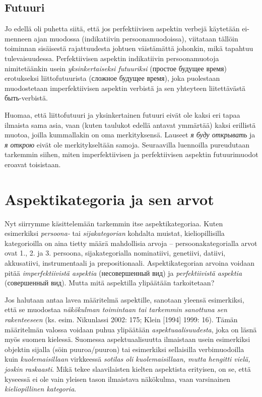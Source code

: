 \documentclass[]{scrreprt}
\begin{document}
\subsection{Futuuri}\label{futuuri}

Jo edellä oli puhetta siitä, että jos perfektiivisen aspektin verbejä
käytetään ei-menneen ajan muodossa (indikatiivin persoonamuodoissa),
viitataan tällöin toiminnan sisäisestä rajattuudesta johtuen väistämättä
johonkin, mikä tapahtuu tulevaisuudessa. Perfektiivisen aspektin
indikatiivin persoonamuotoja nimitetäänkin usein \emph{yksinkertaiseksi
futuuriksi} (простое будущее время) erotukseksi liittofutuurista
(сложное будущее время), joka puolestaan muodostetaan imperfektiivisen
aspektin verbistä ja sen yhteyteen liitettävästä быть-verbistä.

Huomaa, että liittofutuuri ja yksinkertainen futuuri eivät ole kaksi eri
tapaa ilmaista sama asia, vaan (kuten taulukot edellä antavat ymmärtää)
kaksi erillistä muotoa, joilla kummallakin on oma merkityksensä. Lauseet
\emph{я буду открывать} ja \emph{я открою} eivät ole merkitykseltään
samoja. Seuraavilla luennoilla pureudutaan tarkemmin siihen, miten
imperfektiivisen ja perfektiivisen aspektin futuurimuodot eroavat
toisistaan.

\section{Aspektikategoria ja sen
arvot}\label{aspektikategoria-ja-sen-arvot}

Nyt siirrymme käsittelemään tarkemmin itse aspektikategoriaa. Kuten
esimerkiksi \emph{persoona-} tai \emph{sijakategorian} kohdalta muistat,
kieliopillisilla kategorioilla on aina tietty määrä mahdollisia arvoja
-- persoonakategorialla arvot ovat 1., 2. ja 3. persoona,
sijakategorialla nominatiivi, genetiivi, datiivi, akkusatiivi,
instrumentaali ja prepositionaali. Aspektikategorian arvoina voidaan
pitää \emph{imperfektiivistä aspektia} (несовершенный вид) ja
\emph{perfektiivistä aspektia} (совершенный вид). Mutta mitä aspektilla
ylipäätään tarkoitetaan?

Jos halutaan antaa lavea määritelmä aspektille, sanotaan yleensä
esimerkiksi, että se muodostaa \emph{näkökulman toimintaan tai tarkemmin
sanottuna sen rakenteeseen} (ks. esim. Nikunlassi 2002: 175; Klein
{[}1994{]} 1999: 16). Tämän määritelmän valossa voidaan puhua ylipäätään
\emph{aspektuaalisuudesta}, joka on läsnä myös suomen kielessä. Suomessa
aspektuaalisuutta ilmaistaan usein esimerkiksi objektin sijalla (söin
puuroa/puuron) tai esimerkiksi sellaisilla verbimuodoilla kuin
\emph{kuolemaisillaan} virkkeessä \emph{sotilas oli kuolemaisillaan,
mutta hengitti vielä, joskin raskaasti}. Mikä tekee slaavilaisten
kielten aspektista erityisen, on se, että kyseessä ei ole vain yleisen
tason ilmaistava näkökulma, vaan varsinainen \emph{kieliopillinen
kategoria}.
\end{document}
